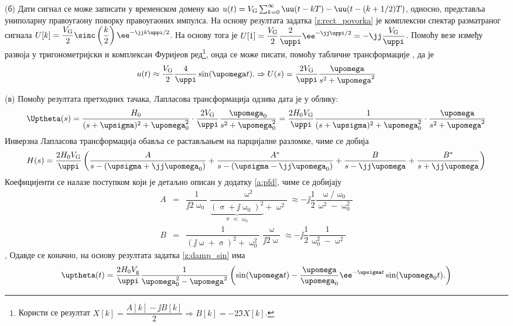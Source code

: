 (б) Дати сигнал се може записати у временском домену као 
$u(t) = V_{\rm G} \sum_{k = 0}^{\infty} \uu(t - kT) - \uu(t - (k+1/2)T)$, односно, представља униполарну правоугаону поворку 
правоугаоних импулса. 
На основу резултата задатка \ref{z:rect_povorka} је комплексни спектар разматраног сигнала
$U[k] = \dfrac{V_{\rm G}}{2} \sinc\left(\dfrac{k}{2}\right) \ee^{-\jj k \uppi / 2 } $.
На основу тога је
$U[1] = \dfrac{V_{\rm G}}{2} \dfrac{2}{\uppi} \ee^{-\jj\uppi/2} = - \jj \dfrac{V_{\rm G}}{\uppi}$.
Помоћу везе између развоја у тригонометријски и комплексан Фуријеов ред\footnote{Користи се 
резултат $X[k] = \dfrac{A[k] - \jj B[k]}{2} \Rightarrow B[k] = -2 \Im{X[k]}$.
}, онда се може писати, помоћу табличне трансформације , да је 
\begin{equation}
    u(t) \approx \dfrac{V_{\rm G}}{2}  
    \dfrac{4}{\uppi} \sin(\upomega t) .
    \Rightarrow
    U(s) = 
    \dfrac{2 V_{\rm G}}{\uppi}
    \dfrac{\upomega }{s^2 + \upomega^2}
\end{equation}

(в) Помоћу резултата претходних тачака, Лапласова трансформација одзива дата је у облику: 
\begin{equation}
    \Uptheta(s) =
    \dfrac{H_0}{(s + \upsigma)^2 + \upomega_0^2}
    \cdot
    \dfrac{2 V_{\rm G}}{\uppi}
    \dfrac{\upomega_0 }{s^2 + \upomega_0^2}
    = 
    \dfrac{2 H_0 V_{\rm G}}{\uppi}
    \dfrac{1}{(s + \upsigma)^2 + \upomega_0^2}
    \cdot
    \dfrac{\upomega }{s^2 + \upomega^2}
\end{equation}
Инверзна Лапласова трансформација обавља се растављањем на парцијалне разломке, чиме се добија 
\begin{equation}
    H(s) = 
    \dfrac{2 H_0 V_{\rm G}}{\uppi} \left(
    \dfrac{A}{ s - (\upsigma + \jj\upomega_0 ) } + \dfrac{A^\ast}{ s - (\upsigma - \jj\upomega_0 ) } 
    + \dfrac{B}{s - \jj\upomega} + \dfrac{B^*}{s + \jj\upomega}  
    \right)
\end{equation}
Коефицијенти се налазе поступком који је детаљно описан у додатку \ref{a:pfd}, чиме се добијају
\begin{eqnarray}
    A &=& \dfrac{1}{\jj2\upomega_0} \dfrac{\upomega^2}{ \underbrace{( \upsigma + \jj\upomega_0)^2}_{\upsigma \ll \upomega_0} + \upomega^2 }
   \approx 
   - \jj
   \dfrac{1}{2} \dfrac{\upomega/\upomega_0} { \upomega^2 - \upomega_0^2 } \\
   B &=& \dfrac{1}{ (\jj\upomega + \upsigma)^2 + \upomega_0^2 } \dfrac{\upomega}{\jj2\upomega}
   \approx
   - \jj 
   \dfrac{1}{2} 
   \dfrac{1}{\upomega_0^2 - \upomega^2}
\end{eqnarray},
Одавде се коначно, на основу резултата задатка \ref{z:damp_sin} има 
\begin{equation}
    \uptheta(t) = \dfrac{2 H_0 V_{\rm g}}{\uppi}
    \dfrac{1}{\upomega_0^2 - \upomega^2}
    \left(
        \sin(\upomega t )
        -
        \dfrac{\upomega}{\upomega_0} \ee^{-\upsigma t} \sin(\upomega_0 t ). \label{\ID.odziv}
    \right)
\end{equation}

